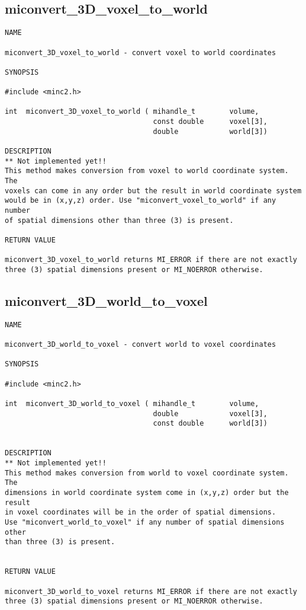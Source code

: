 \documentclass{article}
\begin{document}
\subsection{miconvert\_3D\_voxel\_to\_world}
\begin{verbatim}
NAME 

miconvert_3D_voxel_to_world - convert voxel to world coordinates

SYNOPSIS

#include <minc2.h>

int  miconvert_3D_voxel_to_world ( mihandle_t        volume,
                                   const double      voxel[3],
                                   double            world[3])
                                
DESCRIPTION
** Not implemented yet!!
This method makes conversion from voxel to world coordinate system. The
voxels can come in any order but the result in world coordinate system 
would be in (x,y,z) order. Use "miconvert_voxel_to_world" if any number
of spatial dimensions other than three (3) is present.

RETURN VALUE

miconvert_3D_voxel_to_world returns MI_ERROR if there are not exactly
three (3) spatial dimensions present or MI_NOERROR otherwise.
\end{verbatim}

\subsection{miconvert\_3D\_world\_to\_voxel}
\begin{verbatim}
NAME 

miconvert_3D_world_to_voxel - convert world to voxel coordinates

SYNOPSIS

#include <minc2.h>

int  miconvert_3D_world_to_voxel ( mihandle_t        volume,
                                   double            voxel[3],
                                   const double      world[3])
                       
                                
DESCRIPTION
** Not implemented yet!!
This method makes conversion from world to voxel coordinate system. The
dimensions in world coordinate system come in (x,y,z) order but the result  
in voxel coordinates will be in the order of spatial dimensions. 
Use "miconvert_world_to_voxel" if any number of spatial dimensions other
than three (3) is present.


RETURN VALUE

miconvert_3D_world_to_voxel returns MI_ERROR if there are not exactly
three (3) spatial dimensions present or MI_NOERROR otherwise.
\end{verbatim}
\end{document}
